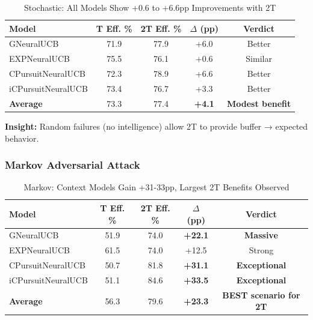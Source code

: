 \documentclass[11pt,a4paper]{article}
\newcommand{\success}[1]{\textcolor{successcolor}{\textbf{#1}}}
\begin{document}
\vspace{-0.4cm}
\begin{table}[H]
\scriptsize
\centering
\begin{tabular}{lcccc}
\toprule
\textbf{Model} & \textbf{T Eff. \%} & \textbf{2T Eff. \%} & \textbf{$\Delta$ (pp)} & \textbf{Verdict} \\
\midrule
GNeuralUCB & 71.9 & 77.9 & +6.0 & Better \\
EXPNeuralUCB & 75.5 & 76.1 & +0.6 & Similar \\
CPursuitNeuralUCB & 72.3 & 78.9 & +6.6 & Better \\
iCPursuitNeuralUCB & 73.4 & 76.7 & +3.3 & Better \\
\midrule
\textbf{Average} & 73.3 & 77.4 & \success{+4.1} & \success{Modest benefit} \\
\bottomrule
\end{tabular}
\vspace{-0.2cm}
\caption{Stochastic: All Models Show +0.6 to +6.6pp Improvements with 2T}
\end{table}

\vspace{-0.2cm}
\textbf{Insight:} Random failures (no intelligence) allow 2T to provide buffer → expected behavior.

\subsubsection{Markov Adversarial Attack}

\vspace{-0.4cm}
\begin{table}[H]
\scriptsize
\centering
\begin{tabular}{lcccc}
\toprule
\textbf{Model} & \textbf{T Eff. \%} & \textbf{2T Eff. \%} & \textbf{$\Delta$ (pp)} & \textbf{Verdict} \\
\midrule
GNeuralUCB & 51.9 & 74.0 & \success{+22.1} & \success{Massive} \\
EXPNeuralUCB & 61.5 & 74.0 & +12.5 & Strong \\
CPursuitNeuralUCB & 50.7 & 81.8 & \success{+31.1} & \success{Exceptional} \\
iCPursuitNeuralUCB & 51.1 & 84.6 & \success{+33.5} & \success{Exceptional} \\
\midrule
\textbf{Average} & 56.3 & 79.6 & \success{+23.3} & \success{BEST scenario for 2T} \\
\bottomrule
\end{tabular}
\vspace{-0.2cm}
\caption{Markov: Context Models Gain +31-33pp, Largest 2T Benefits Observed}
\end{table}
\end{document}
